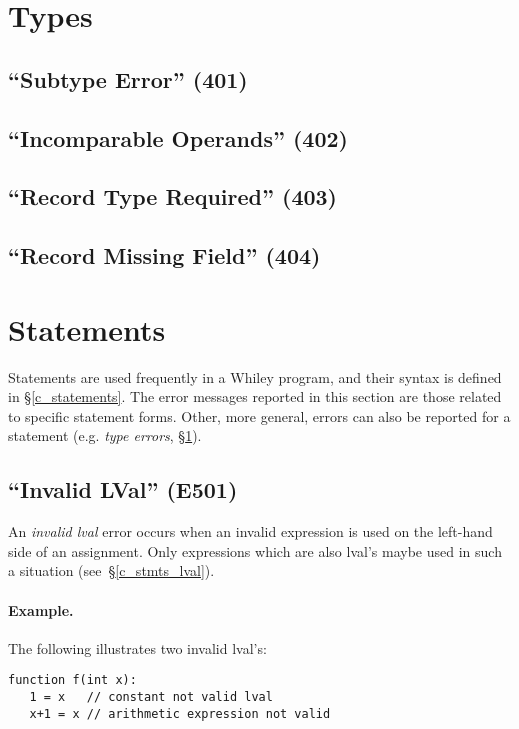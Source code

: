 \section{Types}
\label{c_err_types}

\subsection{``Subtype Error'' (401)}

\subsection{``Incomparable Operands'' (402)}

\subsection{``Record Type Required'' (403)}

\subsection{``Record Missing Field'' (404)}


\section{Statements}

Statements are used frequently in a Whiley program, and their syntax is defined in \S\ref{c_statements}.  The error messages reported in this section are those related to specific statement forms.  Other, more general, errors can also be reported for a statement (e.g. {\em type errors}, \S\ref{c_err_types}).

\subsection{``Invalid LVal'' (E501)}

An {\em invalid lval} error occurs when an invalid expression is used on the left-hand side of an assignment.  Only expressions which are also lval's maybe used in such a situation  (see~\S\ref{c_stmts_lval}).

\paragraph{Example.}  The following illustrates two invalid lval's:

\begin{lstlisting}
function f(int x):
   1 = x   // constant not valid lval
   x+1 = x // arithmetic expression not valid    
\end{lstlisting}

